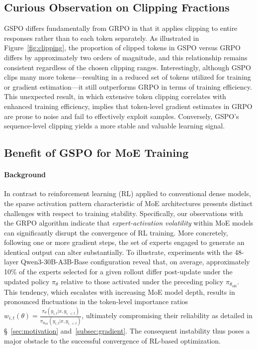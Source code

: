 \subsection{Curious Observation on Clipping Fractions}

GSPO differs fundamentally from GRPO in that it applies clipping to entire responses rather than to each token separately. As illustrated in Figure~\ref{fig:clipping}, the proportion of clipped tokens in GSPO versus GRPO differs by approximately two orders of magnitude, and this relationship remains consistent regardless of the chosen clipping ranges. Interestingly, although GSPO clips many more tokens—resulting in a reduced set of tokens utilized for training or gradient estimation—it still outperforms GRPO in terms of training efficiency. This unexpected result, in which extensive token clipping correlates with enhanced training efficiency, implies that token-level gradient estimates in GRPO are prone to noise and fail to effectively exploit samples. Conversely, GSPO's sequence-level clipping yields a more stable and valuable learning signal.

\subsection{Benefit of GSPO for MoE Training}
\label{subsec:routing_replay}

\paragraph{Background}
In contrast to reinforcement learning (RL) applied to conventional dense models, the sparse activation pattern characteristic of MoE architectures presents distinct challenges with respect to training stability. Specifically, our observations with the GRPO algorithm indicate that \textit{expert-activation volatility} within MoE models can significantly disrupt the convergence of RL training. More concretely, following one or more gradient steps, the set of experts engaged to generate an identical output can alter substantially. To illustrate, experiments with the 48-layer Qwen3-30B-A3B-Base configuration reveal that, on average, approximately 10\% of the experts selected for a given rollout differ post-update under the updated policy $\pi_{\theta}$ relative to those activated under the preceding policy $\pi_{\theta_\text{old}}$.
This tendency, which escalates with increasing MoE model depth, results in pronounced fluctuations in the token-level importance ratios $w_{i,t}(\theta) = \frac{ \pi_{\theta} (y_{i,t} | x, y_{i,<t}) }{ \pi_{\theta_\text{old}} (y_{i,t} | x,y_{i,<t})}$, ultimately compromising their reliability as detailed in \S~\ref{sec:motivation} and~\ref{subsec:gradient}. The consequent instability thus poses a major obstacle to the successful convergence of RL-based optimization.

